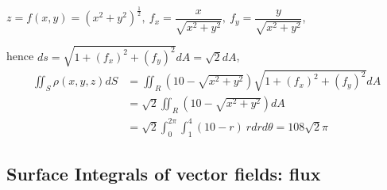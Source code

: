 \documentclass[11pt, a4paper]{MATH2023}
\begin{document}
\begin{spacing}{1.3}
    $z=f(x,y)=(x^2+y^2)^{\frac{1}{2}},\ f_x=\dfrac{x}{\sqrt{x^2+y^2}},\ f_y=\dfrac{y}{\sqrt{x^2+y^2}}$,

    hence $ds=\sqrt{1+(f_x)^2+(f_y)^2}dA=\sqrt{2} dA$,
    \begin{align*}
        \iint_S \rho(x,y,z) dS &= \iint_R \left(10-\sqrt{x^2+y^2}\right)\sqrt{1+(f_x)^2+(f_y)^2}dA\\
         &= \sqrt{2} \iint_R (10-\sqrt{x^2+y^2}) dA\\
         &= \sqrt{2} \int_0^{2\pi} \int_1^4 (10-r)\ r dr d\theta = 108\sqrt{2} \pi
    \end{align*}

    \newpage
    \subsection{Surface Integrals of vector fields: flux}

    

\end{spacing}
\end{document}
